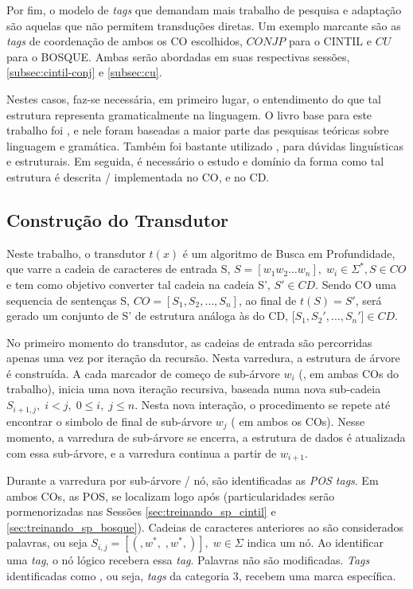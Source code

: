 Por fim, o modelo de \textit{tags} que demandam mais trabalho de pesquisa e adaptação são aquelas que não permitem transduções diretas. Um exemplo marcante são as \textit{tags} de coordenação de ambos os CO escolhidos, $CONJP$ para o CINTIL e $CU$ para o BOSQUE. Ambas serão abordadas em suas respectivas sessões, \ref{subsec:cintil-conj} e \ref{subsec:cu}.

Nestes casos, faz-se necessária, em primeiro lugar, o entendimento do que tal estrutura representa gramaticalmente na linguagem. O livro base para este trabalho foi \cite{Castilho2010gramatica}, e nele foram baseadas a maior parte das pesquisas teóricas sobre linguagem e gramática. Também foi bastante utilizado \cite{mioto2013novo}, para dúvidas linguísticas e estruturais. Em seguida, é necessário o estudo e domínio da forma como tal estrutura é descrita / implementada no CO, e no CD.

\subsection{Construção do Transdutor}
\label{subsec:construcao_transdutor}
Neste trabalho, o transdutor $t(x)$ é um algoritmo de Busca em Profundidade, que varre a cadeia de caracteres de entrada S, $S = [w_1w_2\ldots w_n],\; w_i \in \Sigma^*,S \in CO$ e tem como objetivo converter tal cadeia na cadeia S', $S'\in CD$. Sendo CO uma sequencia de sentenças S, $CO=[S_1,S_2,\ldots,S_n]$, ao final de $t(S)=S'$, será gerado um conjunto de S' de estrutura análoga às do CD, [$S_1,S_2',\ldots,S_n']\in CD$. 

No primeiro momento do transdutor, as cadeias de entrada são percorridas apenas uma vez por iteração da recursão. Nesta varredura, a estrutura de árvore é construída. A cada marcador de começo de sub-árvore $w_i$ (, em ambas COs do trabalho), inicia uma nova iteração recursiva, baseada numa nova sub-cadeia $S_{i+1,j},\;i<j,\;0\leq i,\; j\leq n$. Nesta nova interação, o procedimento se repete até encontrar o simbolo de final de sub-árvore $w_j$ ( em ambos os COs). Nesse momento, a varredura de sub-árvore se encerra, a estrutura de dados é atualizada com essa sub-árvore, e a varredura continua a partir de $w_{i+1}$.

Durante a varredura por sub-árvore / nó, são identificadas as \textit{POS tags}. Em ambos COs, as POS, se localizam logo após \textquote{(} (particularidades serão pormenorizadas nas Sessões \ref{sec:treinando_sp_cintil} e \ref{sec:treinando_sp_bosque}). Cadeias de caracteres anteriores ao \textquote{)} são considerados palavras, ou seja $S_{i,j}=[(, w^*,\;,w^*,)],\;w\in \Sigma$ indica um nó. Ao identificar uma \textit{tag}, o nó lógico recebera essa \textit{tag}. Palavras não são modificadas. \textit{Tags} identificadas como , ou seja, \textit{tags} da categoria 3, recebem uma marca específica.

